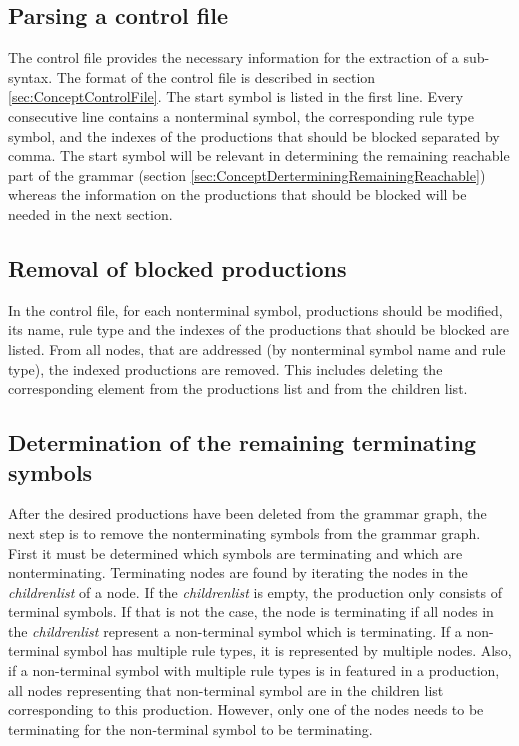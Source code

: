 \subsection{Parsing a control file}\label{sec:ConceptParsingControlFile}

The control file provides the necessary information for the extraction of a sub-syntax.
The format of the control file is described in section \ref{sec:ConceptControlFile}. 
The start symbol is listed in the first line.
Every consecutive line contains a nonterminal symbol, the corresponding rule type symbol, and the indexes of the productions that should be blocked separated by comma.
The start symbol will be relevant in determining the remaining reachable part of the grammar (section \ref{sec:ConceptDerterminingRemainingReachable}) whereas the information on the productions that should be blocked will be needed in the next section.

\subsection{Removal of blocked productions}\label{sec:ConceptRemovingBlockedProductions}

In the control file, for each nonterminal symbol, productions should be modified, its name, rule type and the indexes of the productions that should be blocked are listed.
From all nodes, that are addressed (by nonterminal symbol name and rule type), the indexed productions are removed.
This includes deleting the corresponding element from the productions list and from the children list.

\subsection{Determination of the remaining terminating symbols}\label{sec:ConceptDerterminingRemainingTerminating}

After the desired productions have been deleted from the grammar graph, the next step is to remove the nonterminating symbols from the grammar graph.
First it must be determined which symbols are terminating and which are nonterminating.
Terminating nodes are found by iterating the nodes in the \textit{children\textunderscore list} of a node.
If the \textit{children\textunderscore list} is empty, the production only consists of terminal symbols.
If that is not the case, the node is terminating if all nodes in the \textit{children\textunderscore list} represent a non-terminal symbol which is terminating.
If a non-terminal symbol has multiple rule types, it is represented by multiple nodes. Also, if a non-terminal symbol with multiple rule types is in featured in a production, all nodes representing that non-terminal symbol are in the children list corresponding to this production. However, only one of the nodes needs to be terminating for the non-terminal symbol to be terminating.

